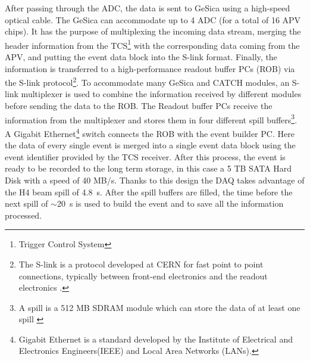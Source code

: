After passing through the ADC, the data is sent to GeSica using a high-speed optical cable. The GeSica can accommodate up to 4 ADC (for a total of 16 APV chips). It has the purpose of multiplexing the incoming data stream, merging the header information from the TCS\footnote{Trigger Control System} with the corresponding data coming from the APV, and putting the event data block into the S-link format. Finally, the information is transferred to a high-performance readout buffer PCs (ROB) via the S-link protocol\footnote{The S-link is a protocol developed at CERN for fast point to point connections, typically between front-end electronics and the readout electronics \cite{s-link}.}. To accommodate many GeSica and CATCH modules, an S-link multiplexer is used to combine the information received by different modules before sending the data to the ROB. The Readout buffer PCs receive the information from the multiplexer and stores them in four different spill buffers\footnote{A spill is a 512 MB SDRAM module which can store the data of at least one spill \cite{COMPASS-daq}}. A Gigabit Ethernet\footnote{Gigabit Ethernet is a standard developed by the Institute of Electrical and Electronics Engineers(IEEE) and Local Area Networks (LANs).} switch connects the ROB with the event builder PC. Here the data of every single event is merged into a single event data block using the event identifier provided by the TCS receiver. After this process, the event is ready to be recorded to the long term storage, in this case a 5 TB SATA Hard Disk with a speed of 40 MB/s. Thanks to this design the DAQ takes advantage of the H4 beam spill of \SI{4.8}{\second}. After the spill buffers are filled, the time before the next spill of $\sim$\SI{20}{\second} is used to build the event and to save all the information processed.

